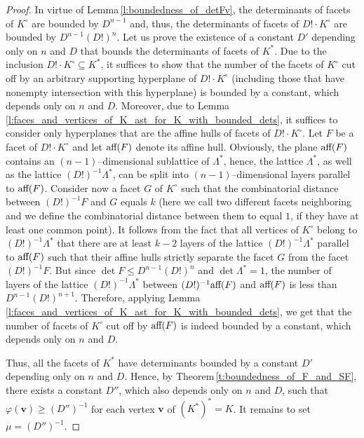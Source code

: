\documentclass[11pt]{article}
\theoremstyle{definition}
\theoremstyle{remark}
\theoremstyle{plain}
\renewcommand{\vec}[1]{\mathbf{#1}}
\renewcommand{\geq}{\geqslant}
\renewcommand{\leq}{\leqslant}
\newcommand{\aff}{\textup{aff}}
\newcommand{\La}{\Lambda}
\begin{document}
\begin{proof}
    In virtue of Lemma\,\ref{l:boundedness_of_detFv}, the determinants of facets of $K^\circ$
    are bounded by $D^{n-1}$ and, thus, the determinants of facets of $D!\cdot K^\circ$
    are bounded by $D^{n-1}(D!)^n$. Let us prove the existence of a constant $D'$ depending
    only on $n$ and $D$ that bounds the determinants of facets of $K^\ast$. Due to the
    inclusion $D!\cdot K^\circ\subseteq K^\ast$, it suffices to show that the number of the
    facets of $K^\circ$ cut off by an arbitrary supporting hyperplane of $D!\cdot K^\circ$
    (including those that have nonempty intersection with this hyperplane) is bounded by a
    constant, which depends only on $n$ and $D$. Moreover, due to
    Lemma\,\ref{l:faces_and_vertices_of_K_ast_for_K_with_bounded_dets}, it suffices to
    consider only hyperplanes that are the affine hulls of facets of $D!\cdot K^\circ$. Let
    $F$ be a facet of $D!\cdot K^\circ$ and let $\aff(F)$ denote its affine hull. Obviously,
    the plane $\aff(F)$ contains an $(n-1)$--dimensional sublattice of $\La^\ast$, hence,
    the lattice $\La^\ast$, as well as the lattice $(D!)^{-1}\La^\ast$, can be split into
    $(n-1)$--dimensional layers parallel to $\aff(F)$. Consider now a facet $G$ of $K^\circ$
    such that the combinatorial distance between $(D!)^{-1}F$ and $G$ equals $k$ (here we
    call two different facets neighboring and we define the combinatorial distance between
    them to equal $1$, if they have at least one common point). It follows from the fact that
    all vertices of $K^\circ$ belong to $(D!)^{-1}\La^\ast$ that there are at least $k-2$
    layers of the lattice $(D!)^{-1}\La^\ast$ parallel to $\aff(F)$ such that their affine
    hulls strictly separate the facet $G$ from the facet $(D!)^{-1}F$. But since
    $\det F\leq D^{n-1}(D!)^n$ and $\det\La^\ast=1$, the number of layers of the lattice
    $(D!)^{-1}\La^\ast$ between $(D!)^{-1}\aff(F)$ and $\aff(F)$ is less than
    $D^{n-1}(D!)^{n+1}$. Therefore, applying
    Lemma\,\ref{l:faces_and_vertices_of_K_ast_for_K_with_bounded_dets}, we get that the
    number of facets of $K^\circ$ cut off by $\aff(F)$ is indeed bounded by a constant, which
    depends only on $n$ and $D$.

    Thus, all the facets of $K^\ast$ have determinants bounded by a constant $D'$ depending
    only on $n$ and $D$. Hence, by Theorem\,\ref{t:boundedness_of_F_and_SF}, there exists a
    constant $D''$, which also depends only on $n$ and $D$, such that
    $\varphi(\vec v)\geq(D'')^{-1}$ for each vertex $\vec v$ of $(K^\ast)^\ast=K$. It remains
    to set $\mu=(D'')^{-1}$.
  \end{proof}
\end{document}
